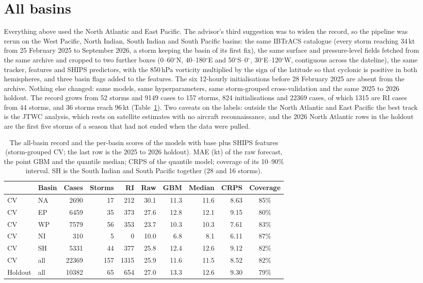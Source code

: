 \documentclass[11pt]{article}
\begin{document}
\FloatBarrier
\section{All basins}\label{sec:global}

Everything above used the North Atlantic and East Pacific. The advisor's third suggestion was to
widen the record, so the pipeline was rerun on the West Pacific, North Indian, South Indian and
South Pacific basins: the same IBTrACS catalogue (every storm reaching 34\,kt from 25 February 2025
to September 2026, a storm keeping the basin of its first fix), the same surface and
pressure-level fields fetched from the same archive and cropped to two further boxes
(0--60$^{\circ}$N, 40--180$^{\circ}$E and 50$^{\circ}$S--0$^{\circ}$, 30$^{\circ}$E--120$^{\circ}$W,
contiguous across the dateline), the same tracker, features and SHIPS predictors, with the
850\,hPa vorticity multiplied by the sign of the latitude so that cyclonic is positive in both
hemispheres, and three basin flags added to the features. The six 12-hourly initialisations
before 28 February 2025 are absent from the archive. Nothing else changed: same models, same
hyperparameters, same storm-grouped cross-validation and the same 2025 to 2026 holdout. The
record grows from 52 storms and 9149 cases to 157 storms, 824 initialisations and 22369 cases,
of which 1315 are RI cases from 44 storms, and 36 storms reach 96\,kt (Table~\ref{tab:basins}).
Two caveats on the labels: outside the North Atlantic and East Pacific the best track is the
JTWC analysis, which rests on satellite estimates with no aircraft reconnaissance, and the 2026
North Atlantic rows in the holdout are the first five storms of a season that had not ended when
the data were pulled.

\begin{table}[t]
\centering
\caption{The all-basin record and the per-basin scores of the models with base plus SHIPS
features (storm-grouped CV; the last row is the 2025 to 2026 holdout). MAE (kt) of the raw
forecast, the point GBM and the quantile median; CRPS of the quantile model; coverage of its
10--90\% interval. SH is the South Indian and South Pacific together (28 and 16 storms).}
\label{tab:basins}
\begin{tabular}{llrrrrrrrc}
\toprule
 & Basin & Cases & Storms & RI & Raw & GBM & Median & CRPS & Coverage \\
\midrule
CV & NA  &  2690 &  17 & 212 & 30.1 & 11.3 & 11.6 & 8.63 & 85\% \\
CV & EP  &  6459 &  35 & 373 & 27.6 & 12.8 & 12.1 & 9.15 & 80\% \\
CV & WP  &  7579 &  56 & 353 & 23.7 & 10.3 & 10.3 & 7.61 & 83\% \\
CV & NI  &   310 &   5 &   0 & 10.0 &  6.8 &  8.1 & 6.11 & 87\% \\
CV & SH  &  5331 &  44 & 377 & 25.8 & 12.4 & 12.6 & 9.12 & 82\% \\
CV & all & 22369 & 157 & 1315 & 25.9 & 11.6 & 11.5 & 8.52 & 82\% \\
\midrule
Holdout & all & 10382 & 65 & 654 & 27.0 & 13.3 & 12.6 & 9.30 & 79\% \\
\bottomrule
\end{tabular}
\end{table}
\end{document}
